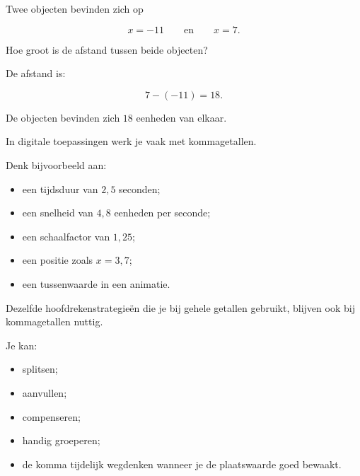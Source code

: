 \documentclass{ximera}
\begin{document}
\begin{oefening}{\oefU}
\begin{question}
\begin{oplossing}
\end{oplossing}

\end{question}


\begin{question}

Twee objecten bevinden zich op

\[
x=-11
\qquad\text{en}\qquad
x=7.
\]

Hoe groot is de afstand tussen beide objecten?

\begin{oplossing}

De afstand is:

\[
7-(-11)
=
18.
\]

De objecten bevinden zich \(18\) eenheden van elkaar.

\end{oplossing}

\end{question}

\end{oefening}



In digitale toepassingen werk je vaak met kommagetallen.

Denk bijvoorbeeld aan:

\begin{itemize}
    \item een tijdsduur van \(2{,}5\) seconden;
    \item een snelheid van \(4{,}8\) eenheden per seconde;
    \item een schaalfactor van \(1{,}25\);
    \item een positie zoals \(x=3{,}7\);
    \item een tussenwaarde in een animatie.
\end{itemize}

Dezelfde hoofdrekenstrategieën die je bij gehele getallen gebruikt, blijven
ook bij kommagetallen nuttig.

Je kan:

\begin{itemize}
    \item splitsen;
    \item aanvullen;
    \item compenseren;
    \item handig groeperen;
    \item de komma tijdelijk wegdenken wanneer je de plaatswaarde goed bewaakt.
\end{itemize}
\end{document}
